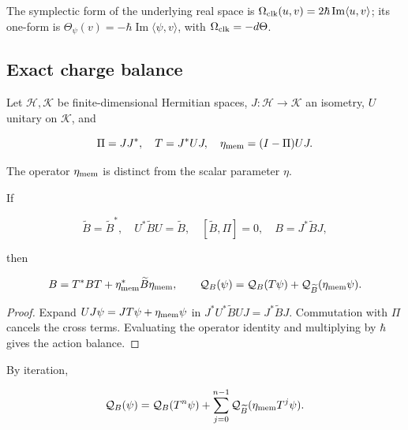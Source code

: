 The symplectic form of the underlying real space is \(\Omega_{\rm clk}(u,v)=2\hbar\operatorname{Im}\langle u,v\rangle\); its one-form is \(\Theta_\psi(v)=-\hbar\operatorname{Im}\langle\psi,v\rangle\), with \(\Omega_{\rm clk}=-d\Theta\).

\subsection{Exact charge balance}

Let \(\mathcal H,\mathcal K\) be finite-dimensional Hermitian spaces, \(J:\mathcal H\to\mathcal K\) an isometry, \(U\) unitary on \(\mathcal K\), and

\begin{equation}
\Pi=JJ^*,\quad T=J^*UJ,\quad
\eta_{\rm mem}=(I-\Pi)UJ.
\label{x_reciprocidad:nuc07:eq:15}
\end{equation}

The operator \(\eta_{\rm mem}\) is distinct from the scalar parameter \(\eta\).

\begin{proposition}
If

\begin{equation}
\widetilde B=\widetilde B^*,\quad U^*\widetilde BU=\widetilde B,
\quad [\widetilde B,\Pi]=0,\quad B=J^*\widetilde BJ,
\label{x_reciprocidad:nuc07:eq:16}
\end{equation}

then

\begin{equation}
B=T^*BT+\eta_{\rm mem}^*\widetilde B\eta_{\rm mem},
\qquad
\mathcal Q_B(\psi)=
\mathcal Q_B(T\psi)+\mathcal Q_{\widetilde B}(\eta_{\rm mem}\psi).
\label{x_reciprocidad:nuc07:eq:17}
\end{equation}
\end{proposition}

\begin{proof}
Expand \(UJ\psi=JT\psi+\eta_{\rm mem}\psi\) in \(J^*U^*\widetilde BUJ=J^*\widetilde BJ\). Commutation with \(\Pi\) cancels the cross terms. Evaluating the operator identity and multiplying by \(\hbar\) gives the action balance.
\end{proof}

By iteration,

\begin{equation}
\mathcal Q_B(\psi)=\mathcal Q_B(T^n\psi)
+\sum_{j=0}^{n-1}\mathcal Q_{\widetilde B}
(\eta_{\rm mem}T^j\psi).
\label{x_reciprocidad:nuc07:eq:18}
\end{equation}

